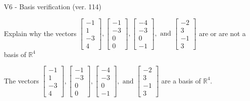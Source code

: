 \begin{exercise}
  \begin{exerciseTitle}V6 - Basis verification (ver. 114)\end{exerciseTitle}
  \begin{exerciseStatement}
    Explain why the vectors \(\left[\begin{array}{r}
-1 \\
1 \\
-3 \\
4
\end{array}\right] , \left[\begin{array}{r}
-1 \\
-3 \\
0 \\
0
\end{array}\right] , \left[\begin{array}{r}
-4 \\
-3 \\
0 \\
-1
\end{array}\right] , \text{ and } \left[\begin{array}{r}
-2 \\
3 \\
-1 \\
3
\end{array}\right]\) are or are not a basis of \(\mathbb{R}^4\)	


  \end{exerciseStatement}
  \begin{exerciseAnswer}
   The vectors \(\left[\begin{array}{r}
-1 \\
1 \\
-3 \\
4
\end{array}\right] , \left[\begin{array}{r}
-1 \\
-3 \\
0 \\
0
\end{array}\right] , \left[\begin{array}{r}
-4 \\
-3 \\
0 \\
-1
\end{array}\right] , \text{ and } \left[\begin{array}{r}
-2 \\
3 \\
-1 \\
3
\end{array}\right]\) 
  	 are  a basis of \(\mathbb{R}^4\).
  


  \end{exerciseAnswer}
\end{exercise}
